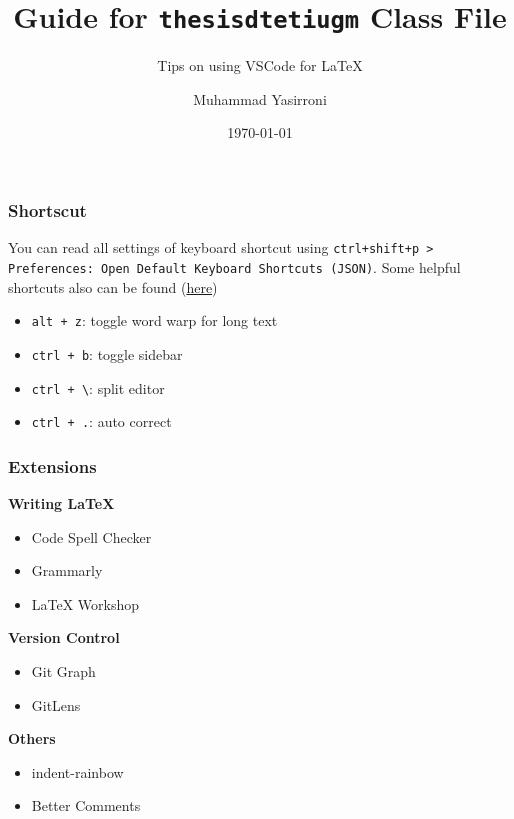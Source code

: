 \documentclass{beamer}
\title{Guide for \texttt{thesisdtetiugm} Class File}
\subtitle{Tips on using VSCode for LaTeX}
\author{Muhammad Yasirroni}
\institute{Universitas Gadjah Mada}
\date{\today}
\begin{document}
\begin{frame}
  \titlepage
\end{frame}

\begin{frame}[fragile]
  \frametitle{Shortscut}

  You can read all settings of keyboard shortcut using \texttt{ctrl+shift+p > Preferences: Open Default Keyboard Shortcuts (JSON)}. Some helpful shortcuts also can be found (\href{https://gist.github.com/bradtraversy/b28a0a361880141af928ada800a671d9}{here})
  \begin{itemize}
    \item \texttt{alt + z}: toggle word warp for long text
    \item \texttt{ctrl + b}: toggle sidebar
    \item \verb|ctrl + \|: split editor
    \item \texttt{ctrl + .}: auto correct
  \end{itemize}
\end{frame}

\begin{frame}
    \frametitle{Extensions}

    \textbf{Writing LaTeX}
    \begin{itemize}
      \item Code Spell Checker
      \item Grammarly
      \item LaTeX Workshop
    \end{itemize}

    \textbf{Version Control}
    \begin{itemize}
        \item Git Graph
        \item GitLens
    \end{itemize}

    \textbf{Others}
    \begin{itemize}
        \item indent-rainbow
        \item Better Comments
    \end{itemize}

\end{frame}
\end{document}
